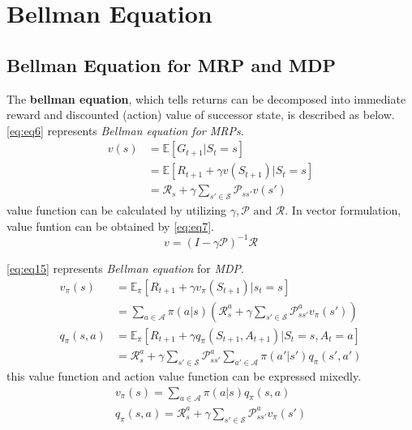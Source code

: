 \documentclass[
	10pt, %
]{article}
\newcommand{\mbb}[1]{\mathbb{#1}}
\newcommand{\mc}[1]{\mathcal{#1}}
\newcommand{\tb}[1]{\textbf{#1}}
\newcommand{\ti}[1]{\textit{#1}}
\numberwithin{equation}{subsection} %
\begin{document}
\section{Bellman Equation}
\subsection{Bellman Equation for MRP and MDP}
The \tb{bellman equation}, which tells returns can be decomposed into immediate reward and discounted (action) value of successor state, is described as below.
\cref{eq:eq6} represents \ti{Bellman equation for MRPs}.
\begin{equation} \label{eq:eq6}
    \begin{aligned}
        v(s) &= \mbb{E}[G_{t+1}|S_t = s] \\
        &= \mbb{E}[R_{t+1} + \gamma v(S_{t+1})|S_t = s] \\
        &= \mc{R}_s + \gamma \sum_{s' \in \mc{S}} \mc{P}_{ss'}v(s')
    \end{aligned}
\end{equation}
value function can be calculated by utilizing $\gamma, \mc{P} \text{ and } \mc{R}$. 
In vector formulation, value funtion can be obtained by \cref{eq:eq7}.
\begin{equation} \label{eq:eq7}
    v = (I - \gamma \mc{P})^{-1}\mc{R}
\end{equation}

\cref{eq:eq15} represents \ti{Bellman equation} for \ti{MDP}.
\begin{equation} \label{eq:eq15}
    \begin{aligned} 
        v_\pi(s)&=\mbb{E}_\pi[R_{t+1}+\gamma v_\pi(S_{t+1})|s_t=s]\\
        &=\sum_{a \in \mc{A}}\pi(a|s)\left(\mc{R}^a_{s}+\gamma\sum_{s' \in \mc{S}}\mc{P}^a_{ss'}v_\pi(s')\right)\\
        q_\pi(s,a)&=\mbb{E}_\pi[R_{t+1}+\gamma q_\pi(S_{t+1},A_{t+1})|S_t=s,A_t=a]\\
        &=\mc{R}^a_s+\gamma \sum_{s' \in \mc{S}}\mc{P}_{ss'}^a \sum_{a' \in \mc{A}} \pi(a'|s')q_\pi(s',a')
    \end{aligned}
\end{equation}
this value function and action value function can be expressed mixedly.
\begin{equation} \label{eq:eq16}
    \begin{gathered}
        v_\pi(s) = \sum_{a \in \mc{A}}\pi(a|s)q_\pi(s,a)\\
        q_\pi(s,a) = \mc{R}^a_s + \gamma\sum_{s' \in \mc{S}}\mc{P}^a_{ss'}v_\pi(s')
    \end{gathered}
\end{equation}
\end{document}
